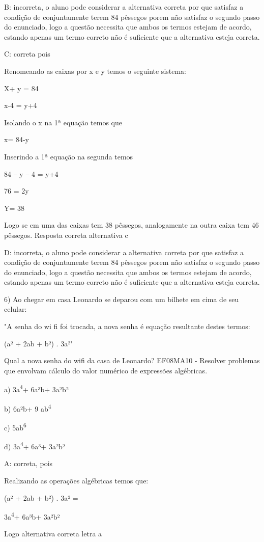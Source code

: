 {B: incorreta, o aluno pode considerar a alternativa correta por que
satisfaz a condição de conjuntamente terem 84 pêssegos porem não
satisfaz o segundo passo do enunciado, logo a questão necessita que
ambos os termos estejam de acordo, estando apenas um termo correto não é
suficiente que a alternativa esteja correta.

C: correta pois

Renomeando as caixas por x e y temos o seguinte sistema:

X+ y = 84

x-4 = y+4

Isolando o x na 1ª equação temos que

x= 84-y

Inserindo a 1ª equação na segunda temos

84 -- y -- 4 = y+4

76 = 2y

Y= 38

Logo se em uma das caixas tem 38 pêssegos, analogamente na outra caixa
tem 46 pêssegos. Resposta correta alternativa c

D: incorreta, o aluno pode considerar a alternativa correta por que
satisfaz a condição de conjuntamente terem 84 pêssegos porem não
satisfaz o segundo passo do enunciado, logo a questão necessita que
ambos os termos estejam de acordo, estando apenas um termo correto não é
suficiente que a alternativa esteja correta.

6) Ao chegar em casa Leonardo se deparou com um bilhete em cima de seu
celular:

"A senha do wi fi foi trocada, a nova senha é equação resultante destes
termos:

(a² + 2ab + b²) . 3a²"

Qual a nova senha do wifi da casa de Leonardo? EF08MA10 - Resolver
problemas que envolvam cálculo do valor numérico de expressões
algébricas.

a) 3a\textsuperscript{4}+ 6a³b+ 3a²b²

b) 6a²b+ 9 ab\textsuperscript{4}

c) 5ab\textsuperscript{6}

d) 3a\textsuperscript{4}+ 6a³+ 3a²b²

A: correta, pois

Realizando as operações algébricas temos que:

(a² + 2ab + b²) . 3a² =

3a\textsuperscript{4}+ 6a³b+ 3a²b²

Logo alternativa correta letra a

}
